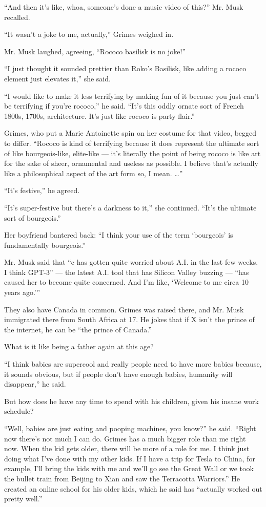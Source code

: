 ``And then it's like, whoa, someone's done a music video of this?'' Mr.
Musk recalled.

``It wasn't a joke to me, actually,'' Grimes weighed in.

Mr. Musk laughed, agreeing, ``Rococo basilisk is no joke!''

``I just thought it sounded prettier than Roko's Basilisk, like adding a
rococo element just elevates it,'' she said.

``I would like to make it less terrifying by making fun of it because
you just can't be terrifying if you're rococo,'' he said. ``It's this
oddly ornate sort of French 1800s, 1700s, architecture. It's just like
rococo is party flair.''

Grimes, who put a Marie Antoinette spin on her costume for that video,
begged to differ. ``Rococo is kind of terrifying because it does
represent the ultimate sort of like bourgeois-like, elite-like --- it's
literally the point of being rococo is like art for the sake of sheer,
ornamental and useless as possible. I believe that's actually like a
philosophical aspect of the art form so, I mean. \ldots{}''

``It's festive,'' he agreed.

``It's super-festive but there's a darkness to it,'' she continued.
``It's the ultimate sort of bourgeois.''

Her boyfriend bantered back: ``I think your use of the term `bourgeois'
is fundamentally bourgeois.''

Mr. Musk said that ``c has gotten quite worried about A.I. in the last
few weeks. I think GPT-3'' --- the latest A.I. tool that has Silicon
Valley buzzing --- ``has caused her to become quite concerned. And I'm
like, `Welcome to me circa 10 years ago.'''

They also have Canada in common. Grimes was raised there, and Mr. Musk
immigrated there from South Africa at 17. He jokes that if X isn't the
prince of the internet, he can be ``the prince of Canada.''

What is it like being a father again at this age?

``I think babies are supercool and really people need to have more
babies because, it sounds obvious, but if people don't have enough
babies, humanity will disappear,'' he said.

But how does he have any time to spend with his children, given his
insane work schedule?

``Well, babies are just eating and pooping machines, you know?'' he
said. ``Right now there's not much I can do. Grimes has a much bigger
role than me right now. When the kid gets older, there will be more of a
role for me. I think just doing what I've done with my other kids. If I
have a trip for Tesla to China, for example, I'll bring the kids with me
and we'll go see the Great Wall or we took the bullet train from Beijing
to Xian and saw the Terracotta Warriors.'' He created an online school
for his older kids, which he said has ``actually worked out pretty
well.''

